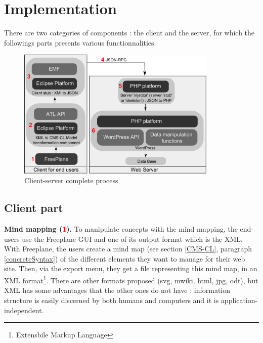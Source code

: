 \section{Implementation}\label{techUse}
There are two categories of components : the client and the server, for which the followings parts presents various functionnalities.
\begin{figure}[!h]
			\centering
			\includegraphics[width=0.85\textwidth]{../resources/pdf/final_ClientServer_numbered.pdf}
			\caption{Client-server complete process}
			\label{finalClientServer}
\end{figure}

	\subsection{Client part}	
		\vspace{0.15em}
		\noindent\textbf{Mind mapping (\textcolor{red}{1}).} To manipulate concepts with the mind mapping, the end-users use the Freeplane GUI and one of its output format which is the XML. With Freeplane, the users create a mind map (see section \ref{CMS-CL}, paragraph \ref{concreteSyntax}) of the different elements they want to manage for their web site.
			Then, via the export menu, they get a file representing this mind map, in an XML format\footnote{Extensbile Markup Language}\cite{xmlPresent}. There are other formats proposed (svg, mwiki, html, jpg, odt), but XML has some advantages that the other ones do not have : information structure is easily discerned by both humans and computers and it is application-independent.			
			
